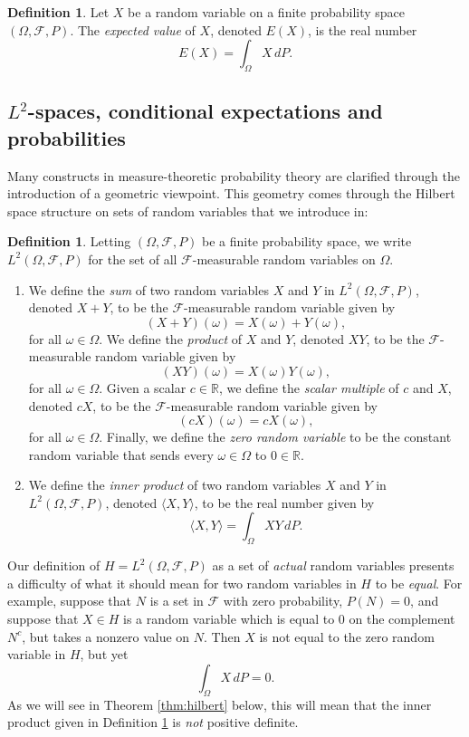 \documentclass[reqno]{amsart}
\theoremstyle{definition}
\newtheorem{defn}[thm]{Definition}
\numberwithin{equation}{section}
\begin{document}
\begin{defn}
Let $X$ be a random variable on a finite probability space $(\Omega, \mathcal{F}, P)$. The \textit{expected value} of $X$, denoted $E(X)$, is the real number
	\[
	E(X) = \int_\Omega X \, dP.
	\]
\end{defn}

\subsection{\texorpdfstring{$L^2$-spaces}{L2-spaces}, conditional expectations and probabilities}

Many constructs in measure-theoretic probability theory are clarified through the introduction of a geometric viewpoint. This geometry comes through the Hilbert space structure on sets of random variables that we introduce in:

\begin{defn}\label{defn:l2}
Letting $(\Omega, \mathcal{F}, P)$ be a finite probability space, we write $L^2(\Omega, \mathcal{F}, P)$ for the set of all $\mathcal{F}$-measurable random variables on $\Omega$.
\begin{enumerate}
\item We define the \textit{sum} of two random variables $X$ and $Y$ in $L^2(\Omega, \mathcal{F}, P)$, denoted $X+Y$, to be the $\mathcal{F}$-measurable random variable given by
	\[
	(X+Y)(\omega) = X(\omega) + Y(\omega),
	\]
for all $\omega \in \Omega$. We define the \textit{product} of $X$ and $Y$, denoted $XY$, to be the $\mathcal{F}$-measurable random variable given by
	\[
	(XY)(\omega) = X(\omega) Y(\omega),
	\] 
for all $\omega\in \Omega$. Given a scalar $c\in \mathbb{R}$, we define the \textit{scalar multiple} of $c$ and $X$, denoted $cX$, to be the $\mathcal{F}$-measurable random variable given by
	\[
	(cX)(\omega) = c X(\omega),
	\]
for all $\omega \in \Omega$. Finally, we define the \textit{zero random variable} to be the constant random variable that sends every $\omega\in \Omega$ to $0\in \mathbb{R}$.
\item We define the \textit{inner product} of two random variables $X$ and $Y$ in $L^2(\Omega, \mathcal{F}, P)$, denoted $\langle X, Y \rangle$, to be the real number given by
	\[
	\langle X, Y\rangle = \int_\Omega XY \, dP.
	\]
\end{enumerate}
\end{defn}

Our definition of $H = L^2(\Omega, \mathcal{F}, P)$ as a set of \textit{actual} random variables presents a difficulty of what it should mean for two random variables in $H$ to be \textit{equal}. For example, suppose that $N$ is a set in $\mathcal{F}$ with zero probability, $P(N)=0$, and suppose that $X\in H$ is a random variable which is equal to $0$ on the complement $N^c$, but takes a nonzero value on $N$. Then $X$ is not equal to the zero random variable in $H$, but yet
	\[
	\int_\Omega X \, dP=0.
	\]
As we will see in Theorem \ref{thm:hilbert} below, this will mean that the inner product given in Definition \ref{defn:l2} is \textit{not} positive definite.
\end{document}
